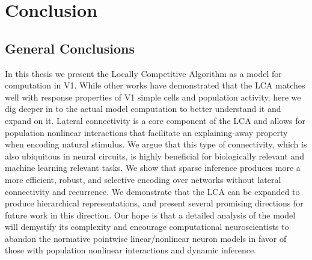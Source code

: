 \chapter{Conclusion}\label{ch:conclusion}

\section{General Conclusions}\label{sec:ch5_summary}
In this thesis we present the Locally Competitive Algorithm as a model for computation in V1. While other works \parencite{zhu2013visual,olshausen1997sparse,vinje2000sparse} have demonstrated that the LCA matches well with response properties of V1 simple cells and population activity, here we dig deeper in to the actual model computation to better understand it and expand on it. Lateral connectivity is a core component of the LCA and allows for population nonlinear interactions that facilitate an explaining-away property when encoding natural stimulus. We argue that this type of connectivity, which is also ubiquitous in neural circuits, is highly beneficial for biologically relevant and machine learning relevant tasks. We show that sparse inference produces more a more efficient, robust, and selective encoding over networks without lateral connectivity and recurrence. We demonstrate that the LCA can be expanded to produce hierarchical representations, and present several promising directions for future work in this direction. Our hope is that a detailed analysis of the model will demystify its complexity and encourage computational neuroscientists to abandon the normative pointwise linear/nonlinear neuron models in favor of those with population nonlinear interactions and dynamic inference.

